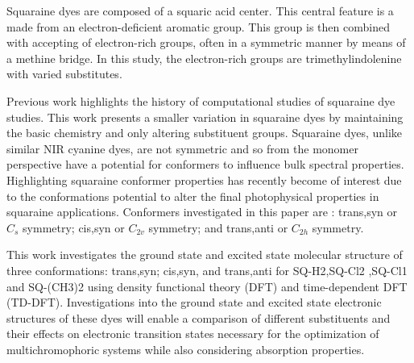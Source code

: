 \documentclass[journal=jacsat,manuscript=article]{achemso}
\begin{document}
Squaraine dyes are composed of a squaric acid center. This central feature is a made from an electron-deficient aromatic group. This group is then combined with accepting of electron-rich groups, often in a symmetric manner by means of a methine bridge\cite{Ilina2020SquaraineChallenges}⁠. In this study, the electron-rich groups are trimethylindolenine with varied substitutes.

Previous work\cite{Bassal2017ExploringADC2}⁠ highlights the history of computational studies of squaraine dye studies. This work presents a smaller variation in squaraine dyes by maintaining the basic chemistry and only altering substituent groups. Squaraine dyes, unlike similar NIR cyanine dyes, are not symmetric and so from the monomer perspective have a potential for conformers to influence bulk spectral properties\cite{Kolosova2018MolecularSquaraines}. Highlighting squaraine conformer properties has recently become of interest due to the conformations potential to alter the final photophysical properties in squaraine applications\citep{Paterno2018ExcitedScenario}. Conformers investigated in this paper are : trans,syn or $C_{s}$ symmetry; cis,syn or $C_{2v}$ symmetry; and trans,anti or $C_{2h}$ symmetry.

This work investigates the ground state and excited state molecular structure of three conformations: trans,syn; cis,syn, and trans,anti for SQ-H2,SQ-Cl2 ,SQ-Cl1 and SQ-(CH3)2 using density functional theory (DFT) and time-dependent DFT (TD-DFT). Investigations into the ground state and excited state electronic structures of these dyes will enable a comparison of different substituents and their effects on electronic transition states necessary for the optimization of multichromophoric systems while also considering absorption properties.  
\end{document}
